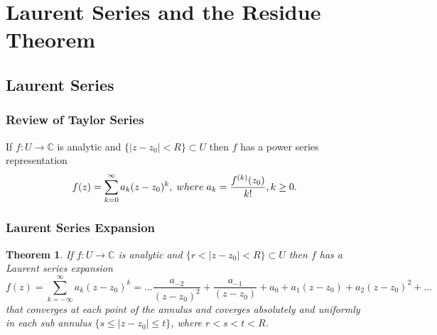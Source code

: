 \documentclass{article}
\newtheorem{theorem}{Theorem}[section]
\begin{document}
\section{Laurent Series and the Residue Theorem}

\subsection{Laurent Series}

\subsubsection{Review of Taylor Series}
If $f : U \to \mathbb{C}$ is analytic and $\{\left|z - z_0\right| < R \} \subset U$ then $f$ has a power series representation
\begin{equation*}
f(z) = \sum_{k=0}^{\infty} a_k(z - z_0)^k, \hspace{0.1cm} where \hspace{0.1cm} a_k = \frac{f^{(k)}(z_0)}{k!}, k \geq 0.
\end{equation*}

\subsubsection{Laurent Series Expansion}
\begin{theorem}
If $f : U \to \mathbb{C}$ is analytic and $\{r < \left|z - z_0 \right| < R \} \subset U$ then $f$ has a Laurent series expansion
\begin{equation*}
f(z) = \sum_{k=-\infty}^{\infty}a_k(z - z_0)^k = ... \frac{a_{-2}}{(z - z_0)^2} + \frac{a_{-1}}{(z - z_0)} + a_0 + a_1(z - z_0) + a_2(z - z_0)^2 + ...
\end{equation*}
that converges at each point of the annulus and coverges absolutely and uniformly in each sub annulus $\{s \leq \left|z - z_0\right| \leq t \}$, where $r < s < t <R$.
\end{theorem}
\end{document}
